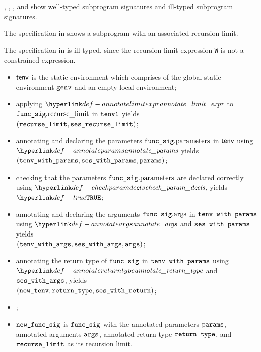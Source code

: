 ,
,
,
and
show well-typed subprogram signatures and ill-typed subprogram signatures.

The specification in  shows a subprogram
with an associated recursion limit.

The specification in  is ill-typed, since the recursion limit expression \verb|W|
is not a constrained expression.

\ProseParagraph
\AllApply
\begin{itemize}
  \item $\textsf{tenv}$ is the static environment which comprises of the global static environment $\texttt{genv}$ and an empty local environment;
  \item applying $\annotatelimitexpr$ to $\texttt{func\_sig}.\text{recurse\_limit}$ in $\texttt{tenv1}$ yields \\
        $(\texttt{recurse\_limit}, \texttt{ses\_recurse\_limit})$\ProseOrTypeError;
  \item annotating and declaring the parameters $\texttt{func\_sig}.\text{parameters}$ in $\textsf{tenv}$ using \\
        $\annotateparams$ yields $(\texttt{tenv\_with\_params}, \texttt{ses\_with\_params}, \texttt{params})$\ProseOrTypeError;
  \item checking that the parameters $\texttt{func\_sig}.\text{parameters}$ are declared correctly using $\checkparamdecls$, yields $\True$\ProseOrTypeError;
  \item annotating and declaring the arguments $\texttt{func\_sig}.\text{args}$ in $\texttt{tenv\_with\_params}$ using $\annotateargs$
        and $\texttt{ses\_with\_params}$ yields\\
        $(\texttt{tenv\_with\_args}, \texttt{ses\_with\_args}, \texttt{args})$\ProseOrTypeError;
  \item annotating the return type of $\texttt{func\_sig}$ in $\texttt{tenv\_with\_params}$ using \\ $\annotatereturntype$ and $\texttt{ses\_with\_args}$, yields\\
        $(\texttt{new\_tenv}, \texttt{return\_type}, \texttt{ses\_with\_return})$\ProseOrTypeError;
  \item {};
  \item $\texttt{new\_func\_sig}$ is $\texttt{func\_sig}$ with the annotated parameters $\texttt{params}$, annotated arguments $\texttt{args}$, annotated return type $\texttt{return\_type}$,
        and $\texttt{recurse\_limit}$ as its recursion limit.
\end{itemize}

